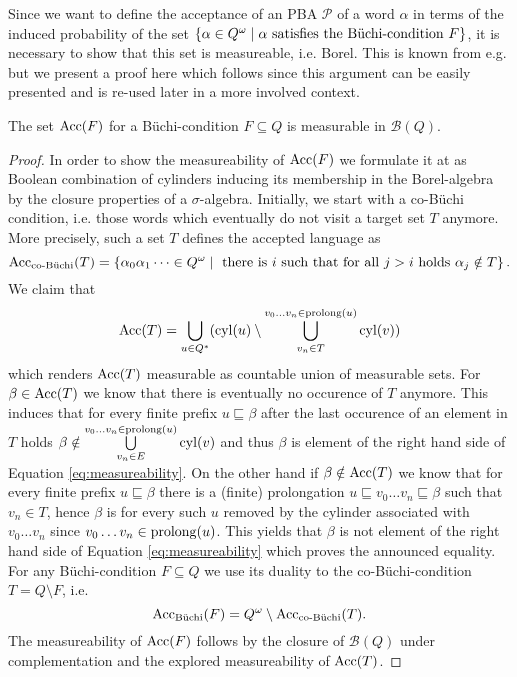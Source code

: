 Since we want to define the acceptance of an \ac{PBA} $\mathcal{P}$ of a word
$\alpha$ in terms of the induced probability of the set 
$\left\{\alpha\in Q^{\omega}\mid\alpha\text{ satisfies the Büchi-condition }F\right\}$,
it is necessary to show that this set is measureable, i.e. Borel. This is known
from e.g. \cite[Chapter 4.1.1.]{Groesser} but we present a proof here which
follows \cite[Proposition 6]{RandAutoInfTrees} since this argument can be
easily presented and is re-used later in a more involved context.
\begin{lemma}[Measurability]
  The set $\operatorname{Acc}(F)$ for a Büchi-condition $F\subseteq Q$ is measurable in 
  $\mathcal{B}(Q)$.
  \label{lem:measureabilityAcceptance}
\end{lemma}
\begin{proof}
  In order to show the measureability of $\operatorname{Acc}(F)$ we formulate it at as
  Boolean combination of cylinders inducing its membership in the 
  Borel-algebra by the closure properties of a $\sigma$-algebra.
  Initially, we start with a co-Büchi condition, i.e. those words which 
  eventually do not visit a target set $T$ anymore. More precisely, such a 
  set $T$ defines the accepted language as
  \begin{equation*}
    \operatorname{Acc}_{\operatorname{co-B\ddot{u}chi}}(T) = \left\{\alpha_{0}\alpha_{1}\dots\in Q^{\omega}\mid
    \text{ there is } i \text{ such that for all } j>i \text{ holds }
    \alpha_{j}\notin T\right\}.
  \end{equation*}
  We claim that
  \begin{equation} 
    \operatorname{Acc}(T) = \bigcup\limits_{u\in Q^{*}}(
    \operatorname{cyl}(u)\setminus\bigcup\limits^{v_{0}\dots v_{n}\in\operatorname{prolong}(u)}_{v_{n}\in T}
    \operatorname{cyl}(v))
    \label{eq:measureability}
  \end{equation}
  which renders $\operatorname{Acc}(T)$ measurable as countable union of measurable sets.
  For $\beta\in\operatorname{Acc}(T)$ we know that there is eventually no occurence of $T$
  anymore. This induces that for every finite prefix $u\sqsubseteq\beta$ after 
  the last occurence of an element in $T$ holds
  $\beta\notin\bigcup\limits^{v_{0}\dots v_{n}\in\operatorname{prolong}(u)}_{v_{n}\in E}
  \operatorname{cyl}(v)$ and thus $\beta$ is element of the right hand side of Equation 
  \ref{eq:measureability}. On the other hand if $\beta\notin\operatorname{Acc}(T)$ we know 
  that for every finite prefix $u\sqsubseteq\beta$ there is a (finite) 
  prolongation $u\sqsubseteq v_{0}\dots v_{n}\sqsubseteq\beta$ such that 
  $v_{n}\in T$, hence $\beta$ is for every such $u$ removed by the cylinder 
  associated with $v_{0}\dots v_{n}$ since $v_{0}\dots v_{n}\in\operatorname{prolong}(u)$.
  This yields that $\beta$ is not element of the right hand side of Equation
  \ref{eq:measureability} which proves the announced equality. 
  For any Büchi-condition $F\subseteq Q$ we use its duality to the 
  co-Büchi-condition $T = Q\setminus F$, i.e.
  \begin{equation*}
    \operatorname{Acc}_{\operatorname{B\ddot{u}chi}}(F) = Q^{\omega}\setminus\operatorname{Acc}_{\operatorname{co-B\ddot{u}chi}}(T).
  \end{equation*}
  The measureability of $\operatorname{Acc}(F)$ follows by the closure of $\mathcal{B}(Q)$
  under complementation and the explored measureability of $\operatorname{Acc}(T)$.
\end{proof}
